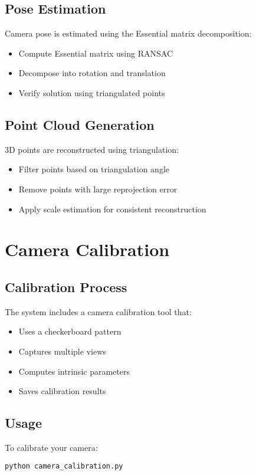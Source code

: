 \documentclass[11pt,a4paper]{article}
\begin{document}
\subsection{Pose Estimation}
Camera pose is estimated using the Essential matrix decomposition:
\begin{itemize}
    \item Compute Essential matrix using RANSAC
    \item Decompose into rotation and translation
    \item Verify solution using triangulated points
\end{itemize}

\subsection{Point Cloud Generation}
3D points are reconstructed using triangulation:
\begin{itemize}
    \item Filter points based on triangulation angle
    \item Remove points with large reprojection error
    \item Apply scale estimation for consistent reconstruction
\end{itemize}

\section{Camera Calibration}
\subsection{Calibration Process}
The system includes a camera calibration tool that:
\begin{itemize}
    \item Uses a checkerboard pattern
    \item Captures multiple views
    \item Computes intrinsic parameters
    \item Saves calibration results
\end{itemize}

\subsection{Usage}
To calibrate your camera:
\begin{lstlisting}[language=bash]
python camera_calibration.py
\end{lstlisting}
\end{document}
